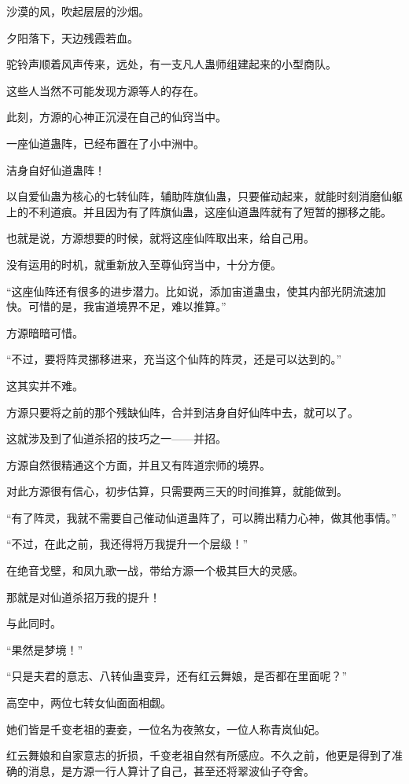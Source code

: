 \begin{this_body}
沙漠的风，吹起层层的沙烟。

夕阳落下，天边残霞若血。

驼铃声顺着风声传来，远处，有一支凡人蛊师组建起来的小型商队。

这些人当然不可能发现方源等人的存在。

此刻，方源的心神正沉浸在自己的仙窍当中。

一座仙道蛊阵，已经布置在了小中洲中。

洁身自好仙道蛊阵！

以自爱仙蛊为核心的七转仙阵，辅助阵旗仙蛊，只要催动起来，就能时刻消磨仙躯上的不利道痕。并且因为有了阵旗仙蛊，这座仙道蛊阵就有了短暂的挪移之能。

也就是说，方源想要的时候，就将这座仙阵取出来，给自己用。

没有运用的时机，就重新放入至尊仙窍当中，十分方便。

“这座仙阵还有很多的进步潜力。比如说，添加宙道蛊虫，使其内部光阴流速加快。可惜的是，我宙道境界不足，难以推算。”

方源暗暗可惜。

“不过，要将阵灵挪移进来，充当这个仙阵的阵灵，还是可以达到的。”

这其实并不难。

方源只要将之前的那个残缺仙阵，合并到洁身自好仙阵中去，就可以了。

这就涉及到了仙道杀招的技巧之一——并招。

方源自然很精通这个方面，并且又有阵道宗师的境界。

对此方源很有信心，初步估算，只需要两三天的时间推算，就能做到。

“有了阵灵，我就不需要自己催动仙道蛊阵了，可以腾出精力心神，做其他事情。”

“不过，在此之前，我还得将万我提升一个层级！”

在绝音戈壁，和凤九歌一战，带给方源一个极其巨大的灵感。

那就是对仙道杀招万我的提升！

与此同时。

“果然是梦境！”

“只是夫君的意志、八转仙蛊变异，还有红云舞娘，是否都在里面呢？”

高空中，两位七转女仙面面相觑。

她们皆是千变老祖的妻妾，一位名为夜煞女，一位人称青岚仙妃。

红云舞娘和自家意志的折损，千变老祖自然有所感应。不久之前，他更是得到了准确的消息，是方源一行人算计了自己，甚至还将翠波仙子夺舍。


\end{this_body}
